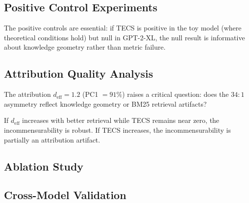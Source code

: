 \subsection{Positive Control Experiments}
\label{sec:positive_results}


The positive controls are essential: if TECS is positive in the toy model (where theoretical conditions hold) but null in GPT-2-XL, the null result is informative about knowledge geometry rather than metric failure.

\subsection{Attribution Quality Analysis}
\label{sec:gm_quality}

The attribution $d_{\text{eff}} = 1.2$ (PC1 $= 91\%$) raises a critical question: does the $34{:}1$ asymmetry reflect knowledge geometry or BM25 retrieval artifacts?


If $d_{\text{eff}}$ increases with better retrieval while TECS remains near zero, the incommensurability is robust.
If TECS increases, the incommensurability is partially an attribution artifact.

\subsection{Ablation Study}
\label{sec:ablation}


\subsection{Cross-Model Validation}
\label{sec:crossmodel}

